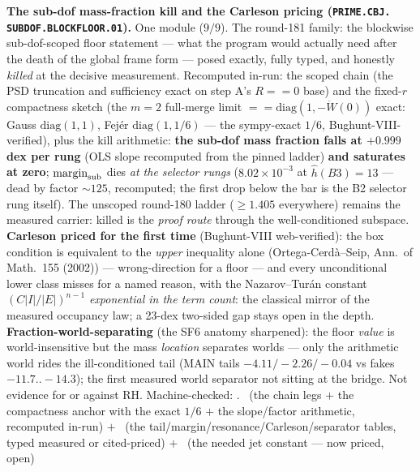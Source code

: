 \documentclass[11pt,a4paper]{article}
\theoremstyle{definition}
\begin{document}
\par\smallskip\noindent\textbf{The sub-dof mass-fraction kill and
the Carleson pricing (\texttt{PRIME.\allowbreak CBJ.\allowbreak
SUBDOF.\allowbreak BLOCKFLOOR.01}).}
One module ($9/9$).  The round-181 family: the blockwise
sub-dof-scoped floor statement --- what the program would actually
need after the death of the global frame form --- posed exactly,
fully typed, and honestly \emph{killed} at the decisive
measurement.  Recomputed in-run: the scoped chain (the PSD
truncation and sufficiency exact on step A's $R == 0$ base) and
the fixed-$r$ compactness sketch (the $m = 2$ full-merge limit
$== \mathrm{diag}(1, -\ddot W(0))$ exact: Gauss $\mathrm{diag}(1,
1)$, Fej\'er $\mathrm{diag}(1, 1/6)$ --- the sympy-exact $1/6$,
Bughunt-VIII-verified), plus the kill arithmetic: \textbf{the
sub-dof mass fraction falls at $+0.999$ dex per rung} (OLS slope
recomputed from the pinned ladder) \textbf{and saturates at zero};
$\mathrm{margin}_{\rm sub}$ dies \emph{at the selector rungs}
($8.02\times10^{-3}$ at $\hat h(B3) = 13$ --- dead by factor
${\sim}125$, recomputed; the first drop below the bar is the B2
selector rung itself).  The unscoped round-180 ladder ($\ge 1.405$
everywhere) remains the measured carrier: killed is the
\emph{proof route} through the well-conditioned subspace.
\textbf{Carleson priced for the first time} (Bughunt-VIII
web-verified): the box condition is equivalent to the \emph{upper}
inequality alone (Ortega-Cerd\`a--Seip, Ann.\ of Math.\ 155
(2002)) --- wrong-direction for a floor --- and every unconditional
lower class misses for a named reason, with the Nazarov--Tur\'an
constant $(C|I|/|E|)^{n-1}$ \emph{exponential in the term count}:
the classical mirror of the measured occupancy law; a 23-dex
two-sided gap stays open in the depth.
\textbf{Fraction-world-separating} (the SF6 anatomy sharpened):
the floor \emph{value} is world-insensitive but the mass
\emph{location} separates worlds --- only the arithmetic world
rides the ill-conditioned tail (MAIN tails $-4.11/-2.26/-0.04$ vs
fakes $-11.7..-14.3$); the first measured world separator not
sitting at the bridge.  Not evidence for or against RH.
Machine-checked: .
\mE\ (the chain legs $+$ the compactness anchor with the exact
$1/6$ $+$ the slope/factor arithmetic, recomputed in-run) $+$
\mC\ (the tail/margin/resonance/Carleson/separator tables, typed
measured or cited-priced) $+$ \mO\ (the needed jet constant ---
now priced, open)
\par\smallskip
\end{document}
